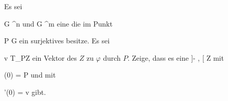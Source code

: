 {

Es sei

\mavergleichskette
{\vergleichskette
{ G
}
{ \subseteq }{ \R^n
}
{  }{
}
{    }{
}
{   }{
}
}
{}{}{}
und
\maabbdisp {\varphi} { G } { \R^m
} {}
eine
die im Punkt

\mavergleichskette
{\vergleichskette
{ P
}
{ \in }{ G
}
{  }{
}
{    }{
}
{   }{
}
}
{}{}{}
ein surjektives
besitze. Es sei

\mavergleichskette
{\vergleichskette
{ v
}
{ \in }{ T_PZ
}
{  }{
}
{    }{
}
{   }{
}
}
{}{}{}
ein Vektor des
$Z$ zu $\varphi$ durch $P$. Zeige, dass es eine
\maabbdisp {\gamma} { ]- \epsilon, \epsilon[ } { Z
} {}
 {} {}
mit

\mavergleichskette
{\vergleichskette
{ \gamma(0)
}
{ = }{ P
}
{  }{
}
{    }{
}
{   }{
}
}
{}{}{}
und mit

\mavergleichskettedisp
{\vergleichskette
{ \gamma'(0)
}
{ =} { v
}
{ } {
}
{ } {
}
{ } {
}
}
{}{}{}
gibt.

}
